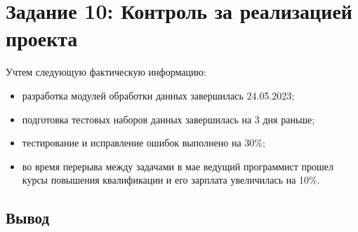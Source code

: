 \section{Задание 10: Контроль за реализацией проекта}

Учтем следующую фактическую информацию:

\begin{itemize}
    \item разработка модулей обработки данных завершилась 24.05.2023;
    \item подготовка тестовых наборов данных завершилась на 3 дня раньше;
    \item тестирование и исправление ошибок выполнено на 30\%;
    \item во время перерыва между задачами в мае ведущий программист прошел
	курсы повышения квалификации и его зарплата увеличилась на 10\%.
\end{itemize}



\subsection*{Вывод}

